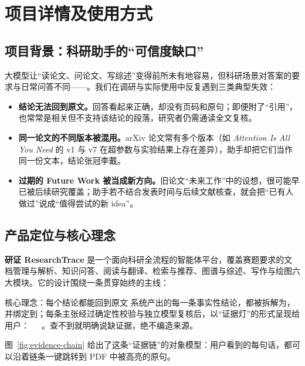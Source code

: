 \section{项目详情及使用方式}\label{sec:details}

\subsection{项目背景：科研助手的“可信度缺口”}

大模型让“读论文、问论文、写综述”变得前所未有地容易，但科研场景对答案的要求与日常问答不同——。我们在调研与实际使用中反复遇到三类典型失效：

\begin{itemize}
  \item \textbf{结论无法回到原文。}回答看起来正确，却没有页码和原句；即便附了“引用”，也常常是相关但不支持该结论的段落，研究者仍需通读全文复核。
  \item \textbf{同一论文的不同版本被混用。}arXiv 论文常有多个版本（如 \emph{Attention Is All You Need} 的 v1 与 v7 在超参数与实验结果上存在差异），助手却把它们当作同一份文本，结论张冠李戴。
  \item \textbf{过期的 Future Work 被当成新方向。}旧论文“未来工作”中的设想，很可能早已被后续研究覆盖；助手若不结合发表时间与后续文献核查，就会把“已有人做过”说成“值得尝试的新 idea”。
\end{itemize}

\subsection{产品定位与核心理念}

\textbf{研证 ResearchTrace} 是一个面向科研全流程的智能体平台，覆盖赛题要求的文档管理与解析、知识问答、阅读与翻译、检索与推荐、图谱与综述、写作与绘图六大模块。它的设计围绕一条贯穿始终的主线：

\begin{keybox}{核心理念：每个结论都能回到原文}
系统产出的每一条事实性结论，都被拆解为，并绑定到；每条主张经过确定性校验与独立模型复核后，以“证据灯”的形式呈现给用户：\ \ \ 。查不到就明确说缺证据，绝不编造来源。
\end{keybox}

图~\ref{fig:evidence-chain} 给出了这条“证据链”的对象模型：用户看到的每句话，都可以沿着链条一键跳转到 PDF 中被高亮的原句。

